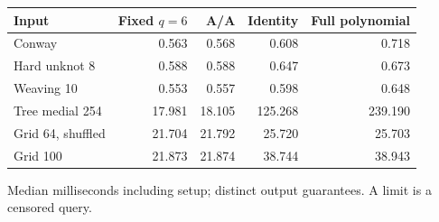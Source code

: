 \begin{center}\small
\begin{tabular}{@{}lrrrr@{}}
\toprule
Input & Fixed $q=6$ & A/A & Identity & Full polynomial \\
\midrule
Conway & 0.563 & 0.568 & 0.608 & 0.718 \\
Hard unknot 8 & 0.588 & 0.588 & 0.647 & 0.673 \\
Weaving 10 & 0.553 & 0.557 & 0.598 & 0.648 \\
Tree medial 254 & 17.981 & 18.105 & 125.268 & 239.190 \\
Grid 64, shuffled & 21.704 & 21.792 & 25.720 & 25.703 \\
Grid 100 & 21.873 & 21.874 & 38.744 & 38.943 \\
\bottomrule
\end{tabular}
\end{center}
Median milliseconds including setup; distinct output guarantees. A limit is a censored query.
